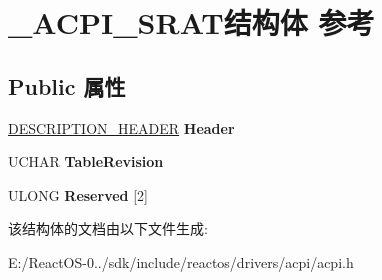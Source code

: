 \hypertarget{struct___a_c_p_i___s_r_a_t}{}\section{\+\_\+\+A\+C\+P\+I\+\_\+\+S\+R\+A\+T结构体 参考}
\label{struct___a_c_p_i___s_r_a_t}
\subsection*{Public 属性}
\begin{DoxyCompactItemize}
\item 
\mbox{\label{struct___a_c_p_i___s_r_a_t_aafa8addad4d34e2729ce7a47f439c67e}} 
\hyperlink{struct___d_e_s_c_r_i_p_t_i_o_n___h_e_a_d_e_r}{D\+E\+S\+C\+R\+I\+P\+T\+I\+O\+N\+\_\+\+H\+E\+A\+D\+ER} {\bfseries Header}
\item 
\mbox{\label{struct___a_c_p_i___s_r_a_t_a8b404ac804e1e29fc9d4fde987f2ec94}} 
U\+C\+H\+AR {\bfseries Table\+Revision}
\item 
\mbox{\label{struct___a_c_p_i___s_r_a_t_aa542942da556c2b8d36a28376d7e5ecb}} 
U\+L\+O\+NG {\bfseries Reserved} \mbox{[}2\mbox{]}
\end{DoxyCompactItemize}


该结构体的文档由以下文件生成\+:\begin{DoxyCompactItemize}
\item 
E\+:/\+React\+O\+S-\/0../sdk/include/reactos/drivers/acpi/acpi.\+h\end{DoxyCompactItemize}
